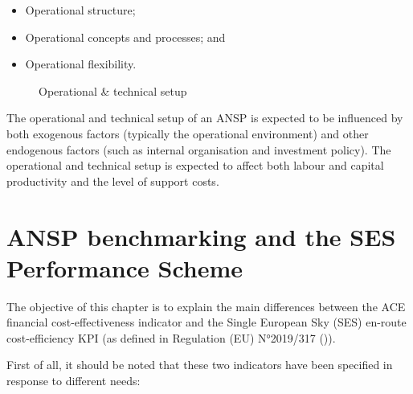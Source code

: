 \documentclass[
  11pt,
  a4paperpaper,
  openany,headsepline=on,footsepline=off,DIV=12,table]{scrbook}
\providecommand{\tightlist}{%
  \setlength{\itemsep}{0pt}\setlength{\parskip}{0pt}}\usepackage{longtable,booktabs,array}
\begin{document}
\begin{itemize}
\tightlist
\item
  Operational structure;
\item
  Operational concepts and processes; and
\item
  Operational flexibility.
\end{itemize}

\begin{figure}[bht]


\caption{\label{fig-operational-setup}Operational \& technical setup}

\end{figure}%

The operational and technical setup of an ANSP is expected to be
influenced by both exogenous factors (typically the operational
environment) and other endogenous factors (such as internal organisation
and investment policy). The operational and technical setup is expected
to affect both labour and capital productivity and the level of support
costs.


\chapter{ANSP benchmarking and the SES Performance
Scheme}\label{ansp-benchmarking-and-the-ses-performance-scheme}

The objective of this chapter is to explain the main differences between
the ACE financial cost-effectiveness indicator and the Single European
Sky (SES) en-route cost-efficiency KPI (as defined in Regulation (EU)
N°2019/317 ()).

First of all, it should be noted that these two indicators have been
specified in response to different needs:
\end{document}
